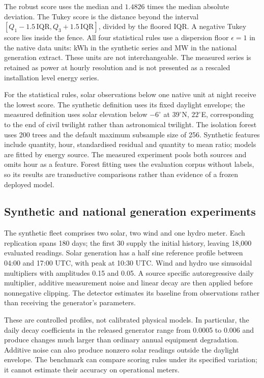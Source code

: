 \documentclass[11pt,a4paper]{article}
\begin{document}
The robust score uses the median and $1.4826$ times the median absolute deviation. The Tukey score is the distance beyond the interval $[Q_1-1.5\,\mathrm{IQR},Q_3+1.5\,\mathrm{IQR}]$, divided by the floored IQR. A negative Tukey score lies inside the fence. All four statistical rules use a dispersion floor $\epsilon=1$ in the native data units: kWh in the synthetic series and MW in the national generation extract. These units are not interchangeable. The measured series is retained as power at hourly resolution and is not presented as a rescaled installation level energy series.

For the statistical rules, solar observations below one native unit at night receive the lowest score. The synthetic definition uses its fixed daylight envelope; the measured definition uses solar elevation below $-6^\circ$ at $39^\circ$N, $22^\circ$E, corresponding to the end of civil twilight rather than astronomical twilight. The isolation forest uses 200 trees and the default maximum subsample size of 256. Synthetic features include quantity, hour, standardised residual and quantity to mean ratio; models are fitted by energy source. The measured experiment pools both sources and omits hour as a feature. Forest fitting uses the evaluation corpus without labels, so its results are transductive comparisons rather than evidence of a frozen deployed model.

\subsection{Synthetic and national generation experiments}\label{sec:chronological}
The synthetic fleet comprises two solar, two wind and one hydro meter. Each replication spans 180 days; the first 30 supply the initial history, leaving 18,000 evaluated readings. Solar generation has a half sine reference profile between 04:00 and 17:00 UTC, with peak at 10:30 UTC. Wind and hydro use sinusoidal multipliers with amplitudes 0.15 and 0.05. A source specific autoregressive daily multiplier, additive measurement noise and linear decay are then applied before nonnegative clipping. The detector estimates its baseline from observations rather than receiving the generator's parameters.

These are controlled profiles, not calibrated physical models. In particular, the daily decay coefficients in the released generator range from 0.0005 to 0.006 and produce changes much larger than ordinary annual equipment degradation. Additive noise can also produce nonzero solar readings outside the daylight envelope. The benchmark can compare scoring rules under its specified variation; it cannot estimate their accuracy on operational meters.
\end{document}
